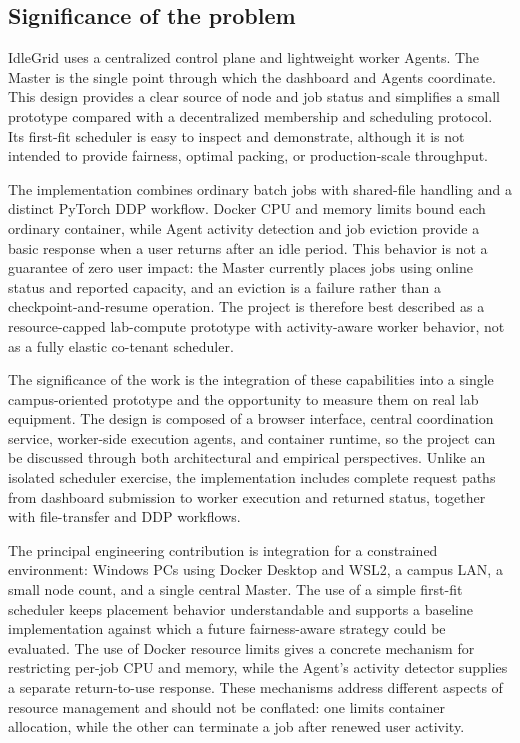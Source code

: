 \documentclass{article}
\begin{document}
    \subsection{Significance of the problem}
	
IdleGrid uses a centralized control plane and lightweight worker Agents. The Master is the single point through which the dashboard and Agents coordinate. This design provides a clear source of node and job status and simplifies a small prototype compared with a decentralized membership and scheduling protocol. Its first-fit scheduler is easy to inspect and demonstrate, although it is not intended to provide fairness, optimal packing, or production-scale throughput.

The implementation combines ordinary batch jobs with shared-file handling and a distinct PyTorch DDP workflow. Docker CPU and memory limits bound each ordinary container, while Agent activity detection and job eviction provide a basic response when a user returns after an idle period. This behavior is not a guarantee of zero user impact: the Master currently places jobs using online status and reported capacity, and an eviction is a failure rather than a checkpoint-and-resume operation. The project is therefore best described as a resource-capped lab-compute prototype with activity-aware worker behavior, not as a fully elastic co-tenant scheduler.

The significance of the work is the integration of these capabilities into a single campus-oriented prototype and the opportunity to measure them on real lab equipment. The design is composed of a browser interface, central coordination service, worker-side execution agents, and container runtime, so the project can be discussed through both architectural and empirical perspectives. Unlike an isolated scheduler exercise, the implementation includes complete request paths from dashboard submission to worker execution and returned status, together with file-transfer and DDP workflows.

The principal engineering contribution is integration for a constrained environment: Windows PCs using Docker Desktop and WSL2, a campus LAN, a small node count, and a single central Master. The use of a simple first-fit scheduler keeps placement behavior understandable and supports a baseline implementation against which a future fairness-aware strategy could be evaluated. The use of Docker resource limits gives a concrete mechanism for restricting per-job CPU and memory, while the Agent's activity detector supplies a separate return-to-use response. These mechanisms address different aspects of resource management and should not be conflated: one limits container allocation, while the other can terminate a job after renewed user activity.
\end{document}
